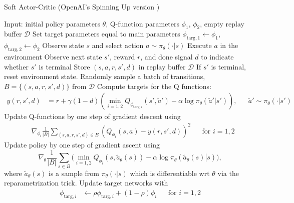 \begin{algorithm}[H] 
\caption{Soft Actor-Critic (OpenAI's Spinning Up version \cite{OpenAI_Spinning_UP})} 
\label{alg:SAC} 
\begin{algorithmic} 
\STATE Input: initial policy parameters $\theta$, Q-function parameters $\phi_1$, $\phi_2$, empty replay buffer $\mathcal{D}$ 
\STATE Set target parameters equal to main parameters $\phi_{\text{targ},1} \leftarrow \phi_1$, $\phi_{\text{targ},2} \leftarrow \phi_2$ 
\REPEAT \STATE Observe state $s$ and select action $a \sim \pi_{\theta}(\cdot|s)$ 
\STATE Execute $a$ in the environment 
\STATE Observe next state $s'$, reward $r$, and done signal $d$ to indicate whether $s'$ is terminal 
\STATE Store $(s,a,r,s',d)$ in replay buffer $\mathcal{D}$ 
\STATE If $s'$ is terminal, reset environment state. 
\STATE Randomly sample a batch of transitions, $B = \{ (s,a,r,s',d) \}$ from $\mathcal{D}$ 
\STATE Compute targets for the Q functions: \begin{align*} y (r,s',d) &= r + \gamma (1-d) \left(\min_{i=1,2} Q_{\phi_{\text{targ}, i}} (s',
\tilde{a}') - \alpha \log \pi_{\theta}(\tilde{a}'|s')\right), && \tilde{a}' \sim \pi_{\theta}(\cdot|s') \end{align*} 
\STATE Update Q-functions by one step of gradient descent using \begin{align*} & \nabla_{\phi_i} \frac{1}{|B|}\sum_{(s,a,r,s',d) \in B} 
\left( Q_{\phi_i}(s,a) - y(r,s',d) \right)^2 && \text{for } i=1,2 \end{align*} 
\STATE Update policy by one step of gradient ascent using \begin{equation*} \nabla_{\theta} \frac{1}{|B|}\sum_{s \in B} \Big(\min_{i=1,2} 
Q_{\phi_i}(s, \tilde{a}_{\theta}(s)) - \alpha \log \pi_{\theta} \left(\left. \tilde{a}_{\theta}(s) \right| s\right) \Big), \end{equation*} 
where $\tilde{a}_{\theta}(s)$ is a sample from $\pi_{\theta}(\cdot|s)$ which is differentiable wrt $\theta$ via the reparametrization trick. 
\STATE Update target networks with \begin{align*} \phi_{\text{targ},i} &\leftarrow \rho \phi_{\text{targ}, i} + (1-\rho) \phi_i && \text{for } i=1,2 \end{align*} 
\ENDFOR 
\ENDIF 
{} 
\end{algorithmic} 
\end{algorithm}



